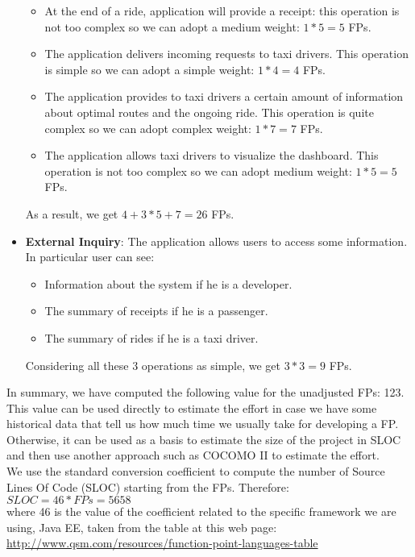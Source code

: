 \begin{itemize}
\begin{itemize}
		\item At the end of a ride, application will provide a receipt: this operation is not too complex so we can adopt a medium weight: $1*5 = 5$ FPs.
		\item The application delivers incoming requests to taxi drivers. This operation is simple so we can adopt a simple weight: $1*4 = 4$ FPs.
		\item The application provides to taxi drivers a certain amount of information about optimal routes and the ongoing ride. This operation is quite complex so we can adopt complex weight: $1*7 = 7$ FPs.
		\item The application allows taxi drivers to visualize the dashboard. This operation is not too complex so we can adopt medium weight: $1*5 = 5$ FPs.
	\end{itemize}
	As a result, we get $4 + 3*5 + 7 = 26$ FPs.
	\item \textbf{External Inquiry}: The application allows users to access some information. In particular user can see:
	\begin{itemize}
		\item Information about the system if he is a developer.
		\item The summary of receipts if he is a passenger.
		\item The summary of rides if he is a taxi driver.
	\end{itemize}
	Considering all these 3 operations as simple, we get $3*3 = 9$ FPs.
\end{itemize}

\noindent In summary, we have computed the following value for the unadjusted FPs: 123. This value can be used directly to estimate the effort in case we have some historical data that tell us how much time we usually take for developing a FP. Otherwise, it can be used as a basis to estimate the size of the project in SLOC and then use another approach such as COCOMO II to estimate the effort. \\
We use the standard conversion coefficient to compute the number of Source Lines Of Code (SLOC) starting from the FPs. Therefore:\\
$SLOC = 46 * FPs = 5658$ \\
where 46 is the value of the coefficient related to the specific framework we are using, Java EE, taken from the table at this web page: \href{http://www.qsm.com/resources/function-point-languages-table}{http://www.qsm.com/resources/function-point-languages-table}
